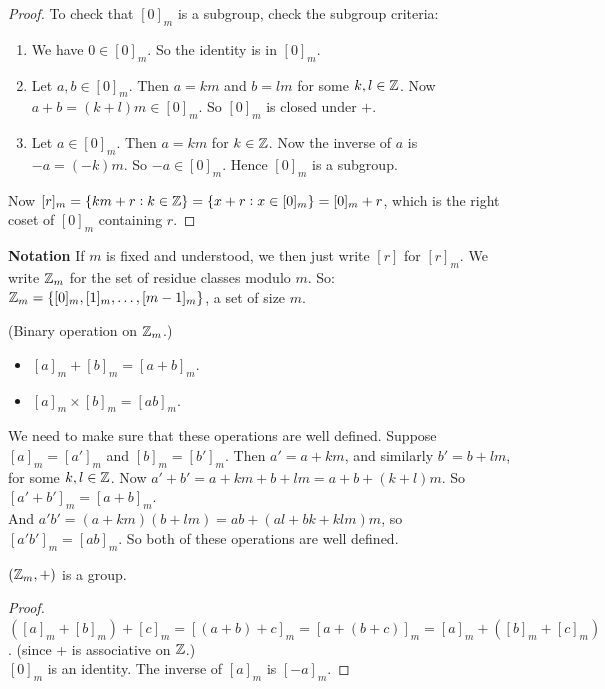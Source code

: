 \documentclass[twoside]{scrartcl}
\begin{document}
\begin{proof}
To check that $[0]_m$ is a subgroup, check the subgroup criteria:\begin{enumerate}
\item We have $ 0 \in [0]_m$. So the identity is in $[0]_m$.
\item Let $a,b \in [0]_m$. Then $a = km$ and $b = lm$ for some $k,l \in \mathbb{Z}$. Now $a+b = (k+l)m\in [0]_m$. So $[0]_m$ is closed under $+$.
\item Let $a \in [0]_m$. Then $a = km$ for $ k \in \mathbb{Z}$. Now the inverse of $a$ is $-a = (-k)m$. So $-a \in [0]_m$. Hence $[0]_m$ is a subgroup. 	
\end{enumerate}

Now $[r]_m = \{km + r : k \in \mathbb{Z}\} = \{x + r : x \in [0]_m\} = [0]_m + r$, which is the right coset of $[0]_m$ containing $r$. 
\end{proof}\vspace*{10pt}


\textbf{Notation} If $m$ is fixed and understood, we then just write $[r]$ for $[r]_m$. We write $\mathbb{Z} _m$ for the set of residue classes modulo $m$. So:\\
 $\mathbb{Z} _m = \{[0]_m,[1]_m,\dots,[m-1]_m\}$, a set of size $m$.\\
 
 
\begin{definition}(Binary operation on $\mathbb{Z}_m$.)\begin{itemize}
\item[] $[a]_m + [b]_m = [a+b]_m$. 
\item[] $[a]_m \times [b]_m = [ab]_m$.
\end{itemize}
\end{definition}

We need to make sure that these operations are well defined. Suppose $[a]_m = [a']_m$ and $[b]_m = [b']_m$. Then $a' = a + km$, and similarly $b' = b + lm$, for some $k,l \in \mathbb{Z}$. Now $a' + b' = a + km + b + lm = a +b + (k+l)m$. So $[a'+b']_m = [a+b]_m$.\\

 And $a'b' = (a+km)(b + lm) = ab + (al+ bk + klm)m$, so $[a'b']_m = [ab]_m$. So both of these operations are well defined.\\
 
 
\begin{proposition} $(\mathbb{Z}_m,+)$ is a group.	
\end{proposition}

\begin{proof}
$([a]_m + [b]_m) + [c]_m = [(a+b) + c]_m = [a+(b+c)]_m = [a]_m + ([b]_m + [c]_m)$. (since + is associative on $\mathbb{Z}$.)\\
 $[0]_m$ is an identity. The inverse of $[a]_m$ is $[-a]_m$.
\end{proof}
\end{document}
